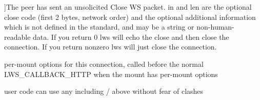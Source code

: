 \begin{Desc}
\begin{description}
{}]The peer has sent an unsolicited Close WS packet. in and len are the optional close code (first 2 bytes, network order) and the optional additional information which is not defined in the standard, and may be a string or non-\/human-\/ readable data. If you return 0 lws will echo the close and then close the connection. If you return nonzero lws will just close the connection. \item[{\em 
L\+W\+S\+\_\+\+C\+A\+L\+L\+B\+A\+C\+K\+\_\+\+H\+T\+T\+P\+\_\+\+P\+MO\hypertarget{group__usercb_ggad62860e19975ba4c4af401c3cdb6abf7aa5cc921b7697743017a533822a3d556a}{}\label{group__usercb_ggad62860e19975ba4c4af401c3cdb6abf7aa5cc921b7697743017a533822a3d556a}
}]per-\/mount options for this connection, called before the normal L\+W\+S\+\_\+\+C\+A\+L\+L\+B\+A\+C\+K\+\_\+\+H\+T\+TP when the mount has per-\/mount options \item[{\em 
L\+W\+S\+\_\+\+C\+A\+L\+L\+B\+A\+C\+K\+\_\+\+U\+S\+ER\hypertarget{group__usercb_ggad62860e19975ba4c4af401c3cdb6abf7a982579753e70e59a9ea13ce628ac891a}{}\label{group__usercb_ggad62860e19975ba4c4af401c3cdb6abf7a982579753e70e59a9ea13ce628ac891a}
}]user code can use any including / above without fear of clashes \end{description}
\end{Desc}

